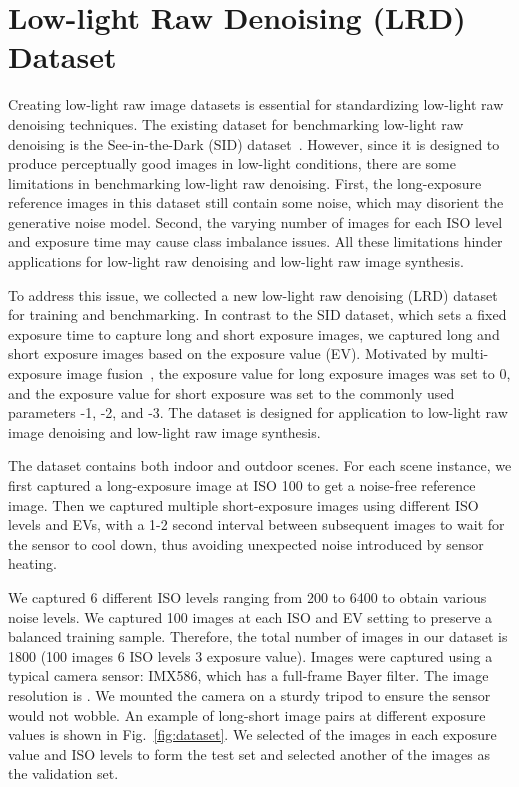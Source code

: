 \documentclass[10pt,twocolumn,letterpaper]{article}
\begin{document}
\section{Low-light Raw Denoising (LRD) Dataset}
Creating low-light raw image datasets is essential for standardizing low-light raw denoising techniques. The existing dataset for benchmarking low-light raw denoising is the See-in-the-Dark (SID) dataset~\cite{chen2018learning}. However, since it is designed to produce perceptually good images in low-light conditions, there are some limitations in benchmarking low-light raw denoising. First, the long-exposure reference images in this dataset still contain some noise, which may disorient the generative noise model. Second, the varying number of images for each ISO level and exposure time may cause class imbalance issues. All these limitations hinder applications for low-light raw denoising and low-light raw image synthesis.

To address this issue, we collected a new low-light raw denoising (LRD) dataset for training and benchmarking. In contrast to the SID dataset, which sets a fixed exposure time to capture long and short exposure images, we captured long and short exposure images based on the exposure value (EV). Motivated by multi-exposure image fusion~\cite{ma2015perceptual, ma2019deep}, the exposure value for long exposure images was set to 0, and the exposure value for short exposure was set to the commonly used parameters -1, -2, and -3. The dataset is designed for application to low-light raw image denoising and low-light raw image synthesis.

The dataset contains both indoor and outdoor scenes. For each scene instance, we first captured a long-exposure image at ISO 100 to get a noise-free reference image. Then we captured multiple short-exposure images using different ISO levels and EVs, with a 1-2 second interval between subsequent images to wait for the sensor to cool down, thus avoiding unexpected noise introduced by sensor heating.

We captured 6 different ISO levels ranging from 200 to 6400 to obtain various noise levels. We captured 100 images at each ISO and EV setting to preserve a balanced training sample. Therefore, the total number of images in our dataset is 1800 (100 images  6 ISO levels  3 exposure value). Images were captured using a typical camera sensor: IMX586, which has a full-frame Bayer filter. The image resolution is . We mounted the camera on a sturdy tripod to ensure the sensor would not wobble. An example of long-short image pairs at different exposure values is shown in Fig.~\ref{fig:dataset}. We selected  of the images in each exposure value and ISO levels to form the test set and selected another  of the images as the validation set.
\end{document}

